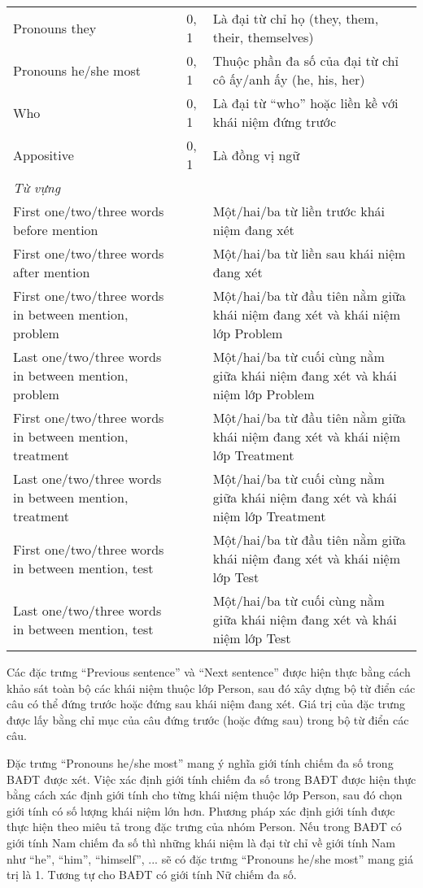 \begin{table}[th]
\begin{tabularx}{\textwidth}{@{}P{\raggedright}{0.3}lL@{}}
\quad Pronouns they & 0, 1 & Là đại từ chỉ họ (they, them, their, themselves)\\
\quad Pronouns he/she most & 0, 1 & Thuộc phần đa số của đại từ chỉ cô ấy/anh ấy (he, his, her)\\
\quad Who & 0, 1 & Là đại từ “who” hoặc liền kề với khái niệm đứng trước\\
\quad Appositive & 0, 1 & Là đồng vị ngữ\\
\emph{Từ vựng}\\
\quad First one/two/three words before mention & & Một/hai/ba từ liền trước khái niệm đang xét\\
\quad First one/two/three words after mention & & Một/hai/ba từ liền sau khái niệm đang xét\\
\quad First one/two/three words in between mention, problem & & Một/hai/ba từ đầu tiên nằm giữa khái niệm đang xét và khái niệm lớp Problem\\
\quad Last one/two/three words in between mention, problem & & Một/hai/ba từ cuối cùng nằm giữa khái niệm đang xét và khái niệm lớp Problem\\
\quad First one/two/three words in between mention, treatment & & Một/hai/ba từ đầu tiên nằm giữa khái niệm đang xét và khái niệm lớp Treatment\\
\quad Last one/two/three words in between mention, treatment & & Một/hai/ba từ cuối cùng nằm giữa khái niệm đang xét và khái niệm lớp Treatment\\
\quad First one/two/three words in between mention, test & & Một/hai/ba từ đầu tiên nằm giữa khái niệm đang xét và khái niệm lớp Test\\
\quad Last one/two/three words in between mention, test & & Một/hai/ba từ cuối cùng nằm giữa khái niệm đang xét và khái niệm lớp Test\\
\bottomrule
\end{tabularx}
\end{table}

Các đặc trưng ``Previous sentence'' và ``Next sentence'' được hiện thực bằng cách khảo sát toàn bộ các khái niệm thuộc lớp Person, sau đó xây dựng bộ từ điển các câu có thể đứng trước hoặc đứng sau khái niệm đang xét. Giá trị của đặc trưng được lấy bằng chỉ mục của câu đứng trước (hoặc đứng sau) trong bộ từ điển các câu.

Đặc trưng ``Pronouns he/she most'' mang ý nghĩa giới tính chiếm đa số trong BAĐT được xét. Việc xác định giới tính chiếm đa số trong BAĐT được hiện thực bằng cách xác định giới tính cho từng khái niệm thuộc lớp Person, sau đó chọn giới tính có số lượng khái niệm lớn hơn. Phương pháp xác định giới tính được thực hiện theo miêu tả trong đặc trưng của nhóm Person. Nếu trong BAĐT có giới tính Nam chiếm đa số thì những khái niệm là đại từ chỉ về giới tính Nam như ``he'', ``him'', ``himself'', ... sẽ có đặc trưng ``Pronouns he/she most'' mang giá trị là 1. Tương tự cho BAĐT có giới tính Nữ chiếm đa số.

